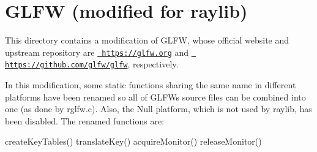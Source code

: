 \chapter{GLFW (modified for raylib)}
\hypertarget{md__2home_2giangvu_2CPPprog_2raylib-tetris_2build_2external_2raylib-master_2src_2external_2glfw_2README}{}\label{md__2home_2giangvu_2CPPprog_2raylib-tetris_2build_2external_2raylib-master_2src_2external_2glfw_2README}
\label{md__2home_2giangvu_2CPPprog_2raylib-tetris_2build_2external_2raylib-master_2src_2external_2glfw_2README_autotoc_md99}%
%
 This directory contains a modification of GLFW, whose official website and upstream repository are \href{https://glfw.org}{\texttt{ https\+://glfw.\+org}} and \href{https://github.com/glfw/glfw}{\texttt{ https\+://github.\+com/glfw/glfw}}, respectively.

In this modification, some static functions sharing the same name in different platforms have been renamed so all of GLFW\textquotesingle{}s source files can be combined into one (as done by {\ttfamily rglfw.\+c}). Also, the Null platform, which is not used by raylib, has been disabled. The renamed functions are\+:

{\ttfamily  create\+Key\+Tables() translate\+Key() acquire\+Monitor() release\+Monitor() } 